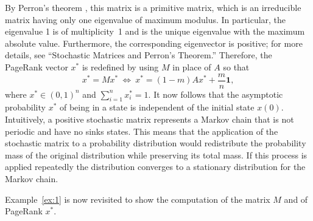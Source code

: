 \documentclass[11pt,draftcls,onecolumn]{IEEEtran}
\newcommand{\one}{\mathbf{1}}
\begin{document}
By Perron's theorem \cite{HorJoh:85}, 
this matrix is a primitive matrix, 
which is an irreducible matrix having only one eigenvalue of maximum modulus.
In particular, the eigenvalue 1 is of multiplicity~1 and 
is the unique eigenvalue with the maximum absolute value. Furthermore,
the corresponding eigenvector is positive; 
for more details, see ``Stochastic Matrices and Perron's Theorem.''
Therefore, the PageRank vector $x^*$ is redefined by using $M$ in place of $A$ so that
\begin{equation}
 x^* = M x^*
   ~\Leftrightarrow~ 
   x^* = (1-m)A x^* + \frac{m}{n}\one,
\label{eqn:prvec}
\end{equation}
where $x^*\in (0,1)^n$ and $\sum_{i=1}^n x^*_i = 1$. 
It now follows that the asymptotic probability $x^*$ of being in a state is independent of the 
initial state $x(0)$. Intuitively, a positive stochastic matrix represents 
a Markov chain that is not periodic and have no sinks states.
This means that the application of the stochastic matrix to a probability 
distribution would redistribute the probability mass of the original distribution 
while preserving its total mass. If this process is applied repeatedly the distribution converges 
to a stationary distribution for the Markov chain.

Example~\ref{ex:1} is now revisited to show the computation 
of the matrix $M$ and of PageRank $x^*$.
\end{document}
